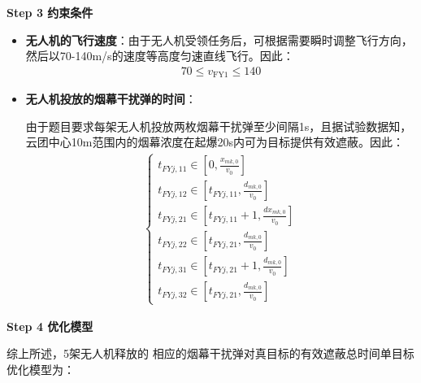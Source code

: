 \documentclass[../main.tex]{subfiles}
\begin{document}
\textbf{Step 3 约束条件}
\begin{itemize}
\item \textbf{无人机的飞行速度}：由于无人机受领任务后，可根据需要瞬时调整飞行方向，然后以70-140m/s的速度等高度匀速直线飞行。因此：
\begin{align}\label{11.8}
  70 \leq v_{\text{FY1}} \leq 140
\end{align}
\item \textbf{无人机投放的烟幕干扰弹的时间}：
\par 由于题目要求每架无人机投放两枚烟幕干扰弹至少间隔1s，且据试验数据知，云团中心10m范围内的烟幕浓度在起爆20s内可为目标提供有效遮蔽。因此：
\begin{align}\label{12345}
\left\{ \begin{array}{l}
	t_{FYj,11}\in \left[ 0, \frac{x_{mk,0}}{v_0} \right]
	\\
	t_{FYj,12}\in \left[ t_{FYj,11}, \frac{d_{mk,0}}{v_0} \right]
	\\
	t_{FYj,21}\in \left[ t_{FYj,11}+1, \frac{dx_{mk,0}}{v_0} \right]
	\\
	t_{FYj,22}\in \left[ t_{FYj,21}, \frac{d_{mk,0}}{v_0} \right]
	\\
	t_{FYj,31}\in \left[ t_{FYj,21}+1, \frac{d_{mk,0}}{v_0} \right]
	\\
	t_{FYj,32}\in \left[ t_{FYj,21}, \frac{d_{mk,0}}{v_0} \right]
\end{array} \right. 
\end{align}
\end{itemize}
\textbf{Step 4 优化模型}
\par 综上所述，5架无人机释放的
相应的烟幕干扰弹对真目标的有效遮蔽总时间单目标优化模型为：
\end{document}
